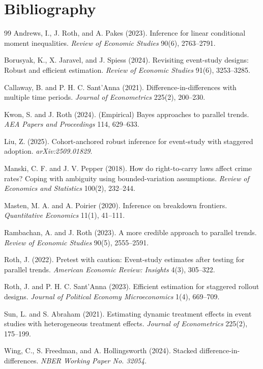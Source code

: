 \documentclass[11pt]{article}
\theoremstyle{definition}
\theoremstyle{plain}
\theoremstyle{remark}
\begin{document}
\section*{Bibliography}
\begin{thebibliography}{99}
Andrews, I., J. Roth, and A. Pakes (2023).
Inference for linear conditional moment inequalities.
\emph{Review of Economic Studies} 90(6), 2763--2791.

Borusyak, K., X. Jaravel, and J. Spiess (2024).
Revisiting event-study designs: Robust and efficient estimation.
\emph{Review of Economic Studies} 91(6), 3253--3285.

Callaway, B. and P. H. C. Sant'Anna (2021).
Difference-in-differences with multiple time periods.
\emph{Journal of Econometrics} 225(2), 200--230.

Kwon, S. and J. Roth (2024).
(Empirical) Bayes approaches to parallel trends.
\emph{AEA Papers and Proceedings} 114, 629--633.

Liu, Z. (2025).
Cohort-anchored robust inference for event-study with staggered adoption.
\emph{arXiv:2509.01829}.

Manski, C. F. and J. V. Pepper (2018).
How do right-to-carry laws affect crime rates? Coping with ambiguity using bounded-variation assumptions.
\emph{Review of Economics and Statistics} 100(2), 232--244.

Masten, M. A. and A. Poirier (2020).
Inference on breakdown frontiers.
\emph{Quantitative Economics} 11(1), 41--111.

Rambachan, A. and J. Roth (2023).
A more credible approach to parallel trends.
\emph{Review of Economic Studies} 90(5), 2555--2591.

Roth, J. (2022).
Pretest with caution: Event-study estimates after testing for parallel trends.
\emph{American Economic Review: Insights} 4(3), 305--322.

Roth, J. and P. H. C. Sant'Anna (2023).
Efficient estimation for staggered rollout designs.
\emph{Journal of Political Economy Microeconomics} 1(4), 669--709.

Sun, L. and S. Abraham (2021).
Estimating dynamic treatment effects in event studies with heterogeneous treatment effects.
\emph{Journal of Econometrics} 225(2), 175--199.

Wing, C., S. Freedman, and A. Hollingsworth (2024).
Stacked difference-in-differences.
\emph{NBER Working Paper No. 32054}.
\end{thebibliography}
\end{document}
